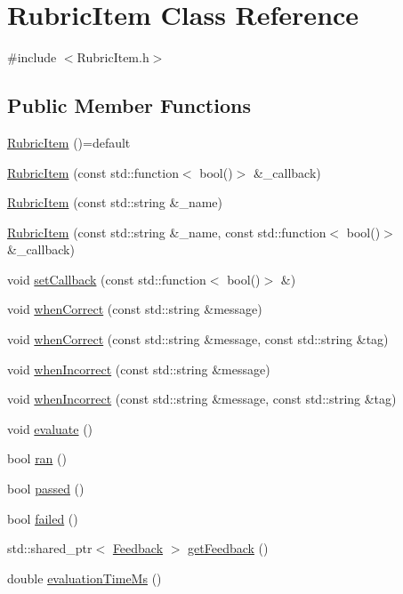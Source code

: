 \hypertarget{class_rubric_item}{}\section{Rubric\+Item Class Reference}
\label{class_rubric_item}


{\ttfamily \#include $<$Rubric\+Item.\+h$>$}

\subsection*{Public Member Functions}
\begin{DoxyCompactItemize}
\item 
\hyperlink{class_rubric_item_a0fac66f38c2f2a1712690c3728b1a63d}{Rubric\+Item} ()=default
\item 
\hyperlink{class_rubric_item_a9ab3ef65052c84f8fb59764429e67980}{Rubric\+Item} (const std\+::function$<$ bool()$>$ \&\+\_\+callback)
\item 
\hyperlink{class_rubric_item_a983d89dd363b56df35c0685c083e7172}{Rubric\+Item} (const std\+::string \&\+\_\+name)
\item 
\hyperlink{class_rubric_item_ae2ff2692b1eb2250e76d3da3fe6fbe79}{Rubric\+Item} (const std\+::string \&\+\_\+name, const std\+::function$<$ bool()$>$ \&\+\_\+callback)
\item 
void \hyperlink{class_rubric_item_a29bf17ee6e15089b388cca8af88dfc4e}{set\+Callback} (const std\+::function$<$ bool()$>$ \&)
\item 
void \hyperlink{class_rubric_item_ac12fa4604d6d09e643e1aadec0a1e8ce}{when\+Correct} (const std\+::string \&message)
\item 
void \hyperlink{class_rubric_item_aeb48935d288d2c6b0ea43e97b51b0d72}{when\+Correct} (const std\+::string \&message, const std\+::string \&tag)
\item 
void \hyperlink{class_rubric_item_a76e977dea00f6bb3512e4f6538e6354f}{when\+Incorrect} (const std\+::string \&message)
\item 
void \hyperlink{class_rubric_item_a90a45d8e42eb51b4f85ebdb2963da26b}{when\+Incorrect} (const std\+::string \&message, const std\+::string \&tag)
\item 
void \hyperlink{class_rubric_item_a83b1d15314c14b6e67207f086d7fa6a5}{evaluate} ()
\item 
bool \hyperlink{class_rubric_item_a96a9432a63552a832a9a8b3b422402e1}{ran} ()
\item 
bool \hyperlink{class_rubric_item_a0b3f8d8fd8cf27e9684510da51a58d6e}{passed} ()
\item 
bool \hyperlink{class_rubric_item_af5675f379ed58476fada3ce92ee698f0}{failed} ()
\item 
std\+::shared\+\_\+ptr$<$ \hyperlink{class_feedback}{Feedback} $>$ \hyperlink{class_rubric_item_a5857824365c39b6c00e8f0f156923955}{get\+Feedback} ()
\item 
double \hyperlink{class_rubric_item_a34a18531cc098667fb47e440b876dc18}{evaluation\+Time\+Ms} ()
\end{DoxyCompactItemize}
